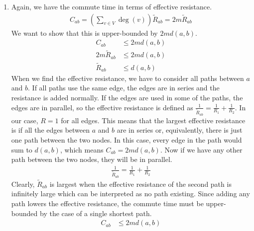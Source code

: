 \documentclass[12pt,a4paper]{article}
\begin{document}
\begin{enumerate}[label=\alph*.]
		\item Again, we have the commute time in terms of effective resistance.
		\begin{gather*}
		C_{ab} = \left( \sum_{v \in V} \deg(v) \right) \tilde{R}_{ab} = 2 m \tilde{R}_{ab}
		\end{gather*}
		We want to show that this is upper-bounded by $2m d(a, b)$.
		\begin{align*}
			C_{ab} &\leq 2m d(a, b)\\
			2 m \tilde{R}_{ab} &\leq 2m d(a, b)\\
			\tilde{R}_{ab} &\leq d(a, b)
		\end{align*}
		When we find the effective resistance, we have to consider all paths between $a$ and $b$. If all paths use the same edge, the edges are in series and the resistance is added normally. If the edges are used in some of the paths, the edges are in parallel, so the effective resistance is defined as $\frac{1}{\tilde{R}_{ab}} = \frac{1}{R_1} + \frac{1}{R_2}$. In our case, $R = 1$ for all edges. This means that the largest effective resistance is if all the edges between $a$ and $b$ are in series or, equivalently, there is just one path between the two nodes. In this case, every edge in the path would sum to $d(a, b)$, which means $C_{ab} = 2m d(a, b)$. Now if we have any other path between the two nodes, they will be in parallel.
		\begin{gather*}
			\frac{1}{\tilde{R}_{ab}} = \frac{1}{R_1} + \frac{1}{R_2}
		\end{gather*}
		Clearly, $\tilde{R}_{ab}$ is largest when the effective resistance of the second path is infinitely large which can be interpreted as no path existing. Since adding any path lowers the effective resistance, the commute time must be upper-bounded by the case of a single shortest path.
		\begin{align*}
		C_{ab} &\leq 2m d(a, b)
		\end{align*}
	\end{enumerate}
	
\end{document}
